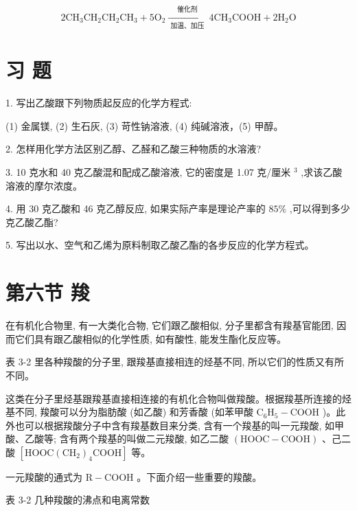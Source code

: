 \documentclass[10pt]{article}
\begin{document}
\[
2{\mathrm{{CH}}}_{3}{\mathrm{{CH}}}_{2}{\mathrm{{CH}}}_{2}{\mathrm{{CH}}}_{3} + 5{\mathrm{O}}_{2}\xrightarrow[\text{ 加温、加压 }]{\text{ 催化剂 }}4{\mathrm{{CH}}}_{3}\mathrm{{COOH}} + 2{\mathrm{H}}_{2}\mathrm{O}
\]

\section*{习 题}

1. 写出乙酸跟下列物质起反应的化学方程式:

(1) 金属镁, (2) 生石灰, (3) 苛性钠溶液, (4) 纯碱溶液，(5) 甲醇。

2. 怎样用化学方法区别乙醇、乙醛和乙酸三种物质的水溶液?

3. 10 克水和 40 克乙酸混和配成乙酸溶液, 它的密度是 1.07 克/厘米 \({}^{3}\) ,求该乙酸溶液的摩尔浓度。

4. 用 30 克乙酸和 46 克乙醇反应, 如果实际产率是理论产率的 \({85}\%\) ,可以得到多少克乙酸乙酯?

5. 写出以水、空气和乙烯为原料制取乙酸乙酯的各步反应的化学方程式。

\section*{第六节 羧}

在有机化合物里, 有一大类化合物, 它们跟乙酸相似, 分子里都含有羧基官能团, 因而它们具有跟乙酸相似的化学性质, 如有酸性, 能发生酯化反应等。

表 3-2 里各种羧酸的分子里, 跟羧基直接相连的烃基不同, 所以它们的性质又有所不同。

这类在分子里烃基跟羧基直接相连接的有机化合物叫做羧酸。根据羧基所连接的烃基不同, 羧酸可以分为脂肪酸 (如乙酸) 和芳香酸 (如苯甲酸 \({\mathrm{C}}_{6}{\mathrm{H}}_{5} - \mathrm{{COOH}}\) )。此外也可以根据羧酸分子中含有羧基数目来分类, 含有一个羧基的叫一元羧酸, 如甲酸、乙酸等; 含有两个羧基的叫做二元羧酸, 如乙二酸 \(\left( {\mathrm{{HOOC}} - \mathrm{{COOH}}}\right)\) 、己二酸 \(\left\lbrack {\mathrm{{HOOC}}{\left( {\mathrm{{CH}}}_{2}\right) }_{4}\mathrm{{COOH}}}\right\rbrack\) 等。

一元羧酸的通式为 \(\mathrm{R} - \mathrm{{COOH}}\) 。下面介绍一些重要的羧酸。

表 3-2 几种羧酸的沸点和电离常数
\end{document}

